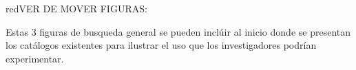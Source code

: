 \documentclass[runningheads]{llncs}
\def \bchregi {\begin{color}{red}}
\def \echregi {\end{color}}
\begin{document}



\bchregi VER DE MOVER FIGURAS: \echregi
Estas 3 figuras de busqueda general se pueden inclúir al inicio donde se presentan los catálogos existentes para ilustrar el uso que los investigadores podrían experimentar.\\
\end{document}
